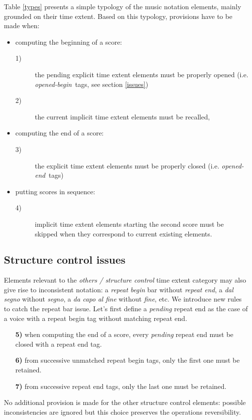\documentclass[twoside,10pt,a4paper]{article}
\newcommand{\rulenum}[1]	{\textbf{#1}}
\newcommand{\oend}			{\emph{opened-end}}
\newcommand{\obeg}			{\emph{opened-begin}}
\begin{document}
Table \ref{types} presents a simple typology of the music notation elements, mainly grounded on their time extent.
Based on this typology, provisions have to be made when:
\begin{itemize}
\item computing the beginning of a score:  
\begin{description}
	\item[1)] the pending explicit time extent elements must be properly opened (i.e. \obeg\ tags, see section \ref{issues})
	\item[2)] the current implicit time extent elements must be recalled,
\end{description}
\item computing the end of a score: 
\begin{description}
	\item[3)] the explicit time extent elements must be properly closed (i.e. \oend\ tags)
\end{description}
\item putting scores in sequence: 
\begin{description}
	\item[4)] implicit time extent elements starting the second score must be skipped when they correspond to current existing elements.
\end{description}
\end{itemize}

\subsection{Structure control issues} \label{sc}
Elements relevant to the \emph{others / structure control} time extent category may also give rise to inconsistent notation: a \emph{repeat begin} bar without \emph{repeat end}, a \emph{dal segno} without \emph{segno}, a \emph{da capo al fine} without \emph{fine}, etc. We introduce new rules to catch the repeat bar issue. Let's first define a \emph{pending} repeat end as the case of a voice with a repeat begin tag without matching repeat end.
\begin{itemize}
\item[\rulenum{5)}] when computing the end of a score, every \emph{pending} repeat end must be closed with a repeat end tag.
\item[\rulenum{6)}] from successive unmatched repeat begin tags, only the first one must be retained.
\item[\rulenum{7)}] from successive repeat end tags, only the last one must be retained.
\end{itemize}
No additional provision is made for the other structure control elements: possible inconsistencies are ignored but this choice preserves the operations reversibility.
\end{document}
